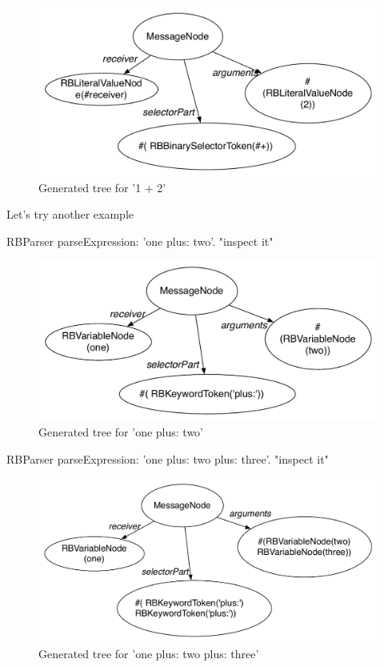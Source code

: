 \documentclass[a4paper,10pt,twoside]{book}
\begin{document}
\begin{figure}[ht]
	\centering
	\includegraphics[width=0.7\linewidth]{SimpleAtomicExpression}
	\caption{Generated tree for  '1 + 2'  }
\end{figure}

Let's try another example
\begin{code}{}
RBParser parseExpression: 'one plus: two'.
"inspect it"
\end{code}


\begin{figure}[ht]\centering
	\includegraphics[width=0.7\linewidth]{SimpleAtomicExpressionP}
	\caption{Generated tree for  'one plus: two' }
\end{figure}



\begin{code}{}
RBParser parseExpression: 'one plus: two plus: three'.
"inspect it"
\end{code}
\begin{figure}[ht]\centering
	\includegraphics[width=0.7\linewidth]{SimpleMultiExpression}
	\caption{Generated tree for  'one plus: two plus: three' }
\end{figure}
\end{document}
